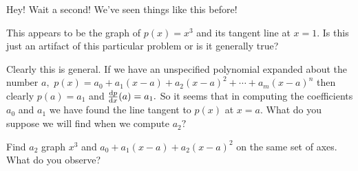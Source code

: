 Hey! Wait a second! We've seen things like this before!

This appears to be the graph of $p(x)=x^3$ and its tangent line at
$x=1.$ Is this just an artifact of this particular problem or is it
generally true?

Clearly this is general. If we have an unspecified polynomial expanded
about the number $a,$ $p(x) = a_0 + a_1(x-a) + a_2(x-a)^2 + \cdots +
a_m(x-a)^n$ then clearly $p(a) = a_1$ and $\frac{\text{d}{p}}{\text{d}{x}}(a) = a_1.$ So
it seems that in computing the coefficients $a_0$ and $a_1$ we have
found the line tangent to $p(x)$ at $x=a.$ What do you suppose we will
find when we compute $a_2?$
\begin{embeddedproblem}{}
 Find $a_2$ graph $x^3$ and $a_0 + a_1(x-a) + a_2(x-a)^2$
    on the same set of axes. What do you observe?
\end{embeddedproblem}

